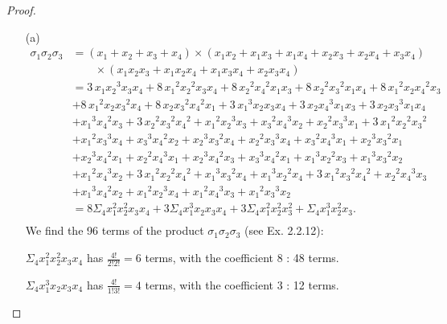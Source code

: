 \documentclass[11pt,a4paper]{article}
\begin{document}
\begin{proof}
\begin{enumerate}
\item[(a)]
\begin{align*}
\sigma_1\sigma_2\sigma_3 &=(x_1+x_2+x_3+x_4)\times(x_1x_2+x_1x_3+x_1x_4+x_2x_3+x_2x_4+x_3x_4)\\
&\qquad\times(x_1x_2x_3+x_1x_2x_4+x_1x_3x_4+x_2x_3x_4)\\
&= 3\,x_{{1}}{x_{{2}}}^{3}x_{{3}}x_{{4}}+8\,{x_{{1}}}^{2}{x_{{2}}}^{2}x_{
{3}}x_{{4}}+8\,{x_{{2}}}^{2}{x_{{4}}}^{2}x_{{1}}x_{{3}}+8\,{x_{{2}}}^{
2}{x_{{3}}}^{2}x_{{1}}x_{{4}}+8\,{x_{{1}}}^{2}x_{{2}}{x_{{4}}}^{2}x_{{
3}}\\
&+8\,{x_{{1}}}^{2}x_{{2}}{x_{{3}}}^{2}x_{{4}}+8\,x_{{2}}{x_{{3}}}^{2
}{x_{{4}}}^{2}x_{{1}}+3\,{x_{{1}}}^{3}x_{{2}}x_{{3}}x_{{4}}+3\,x_{{2}}
{x_{{4}}}^{3}x_{{1}}x_{{3}}+3\,x_{{2}}{x_{{3}}}^{3}x_{{1}}x_{{4}}\\
&+{x_{{1}}}^{3}{x_{{4}}}^{2}x_{{3}}+3\,{x_{{2}}}^{2}{x_{{3}}}^{2}{x_{{4}}}^{
2}+{x_{{1}}}^{2}{x_{{2}}}^{3}x_{{3}}+{x_{{3}}}^{2}{x_{{4}}}^{3}x_{{2}}
+{x_{{2}}}^{2}{x_{{3}}}^{3}x_{{1}}+3\,{x_{{1}}}^{2}{x_{{2}}}^{2}{x_{{3
}}}^{2}\\
&+{x_{{1}}}^{2}{x_{{3}}}^{3}x_{{4}}+{x_{{3}}}^{3}{x_{{4}}}^{2}x_
{{2}}+{x_{{2}}}^{3}{x_{{3}}}^{2}x_{{4}}+{x_{{2}}}^{2}{x_{{3}}}^{3}x_{{
4}}+{x_{{3}}}^{2}{x_{{4}}}^{3}x_{{1}}+{x_{{2}}}^{3}{x_{{3}}}^{2}x_{{1}
}\\
&+{x_{{2}}}^{3}{x_{{4}}}^{2}x_{{1}}+{x_{{2}}}^{2}{x_{{4}}}^{3}x_{{1}}+
{x_{{2}}}^{3}{x_{{4}}}^{2}x_{{3}}+{x_{{3}}}^{3}{x_{{4}}}^{2}x_{{1}}+{x
_{{1}}}^{3}{x_{{2}}}^{2}x_{{3}}+{x_{{1}}}^{3}{x_{{3}}}^{2}x_{{2}}\\
&+{x_{
{1}}}^{2}{x_{{4}}}^{3}x_{{2}}+3\,{x_{{1}}}^{2}{x_{{2}}}^{2}{x_{{4}}}^{
2}+{x_{{1}}}^{3}{x_{{3}}}^{2}x_{{4}}+{x_{{1}}}^{3}{x_{{2}}}^{2}x_{{4}}
+3\,{x_{{1}}}^{2}{x_{{3}}}^{2}{x_{{4}}}^{2}+{x_{{2}}}^{2}{x_{{4}}}^{3}
x_{{3}}\\
&+{x_{{1}}}^{3}{x_{{4}}}^{2}x_{{2}}+{x_{{1}}}^{2}{x_{{2}}}^{3}x_
{{4}}+{x_{{1}}}^{2}{x_{{4}}}^{3}x_{{3}}+{x_{{1}}}^{2}{x_{{3}}}^{3}x_{{
2}}\\
&=8\Sigma_4 x_1^2x_2^2x_3x_4+3\Sigma_4x_1^3x_2x_3x_4+3\Sigma_4x_1^2x_2^2x_3^2+\Sigma_4x_1^3x_2^2x_3.\\
\end{align*}
We find the 96 terms of the product $\sigma_1\sigma_2\sigma_3$ (see Ex. 2.2.12): 

$\Sigma_4 x_1^2x_2^2x_3x_4$  has $\frac{4!}{2!2!} = 6 $ terms, with the coefficient 8 : 48 terms.

$\Sigma_4x_1^3x_2x_3x_4$ has $\frac{4!}{1!3!} = 4$ terms,  with the coefficient 3 : 12 terms.


\end{enumerate}
\end{proof}
\end{document}
